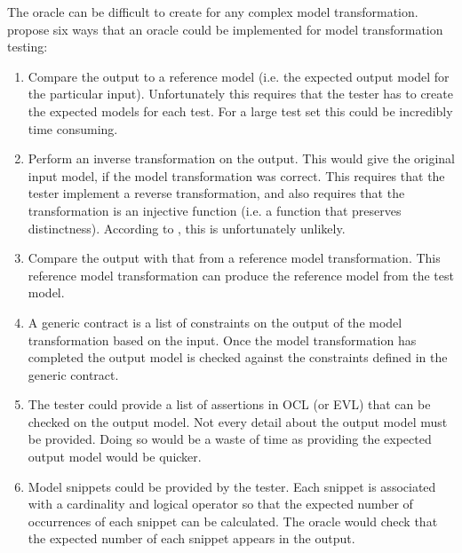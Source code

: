 The oracle can be difficult to create for any complex model transformation. \citet{mttOracleIssue} propose six ways that an oracle could be implemented for model transformation testing:

\begin{enumerate}
	\item Compare the output to a reference model (i.e. the expected output model for the particular input). Unfortunately this requires that the tester has to create the expected models for each test. For a large test set this could be incredibly time consuming.
	\item Perform an inverse transformation on the output. This would give the original input model, if the model transformation was correct. This requires that the tester implement a reverse transformation, and also requires that the transformation is an injective function (i.e. a function that preserves distinctness). According to \citet{mttOracleIssue}, this is unfortunately unlikely.
	\item Compare the output with that from a reference model transformation. This reference model transformation can produce the reference model from the test model. 
	\item A generic contract is a list of constraints on the output of the model transformation based on the input. Once the model transformation has completed the output model is checked against the constraints defined in the generic contract.
	\item The tester could provide a list of assertions in OCL (or EVL) that can be checked on the output model. Not every detail about the output model must be provided. Doing so would be a waste of time as providing the expected output model would be quicker.
	\item Model snippets could be provided by the tester. Each snippet is associated with a cardinality and logical operator so that the expected number of occurrences of each snippet can be calculated. The oracle would check that the expected number of each snippet appears in the output. 
\end{enumerate}





% 
